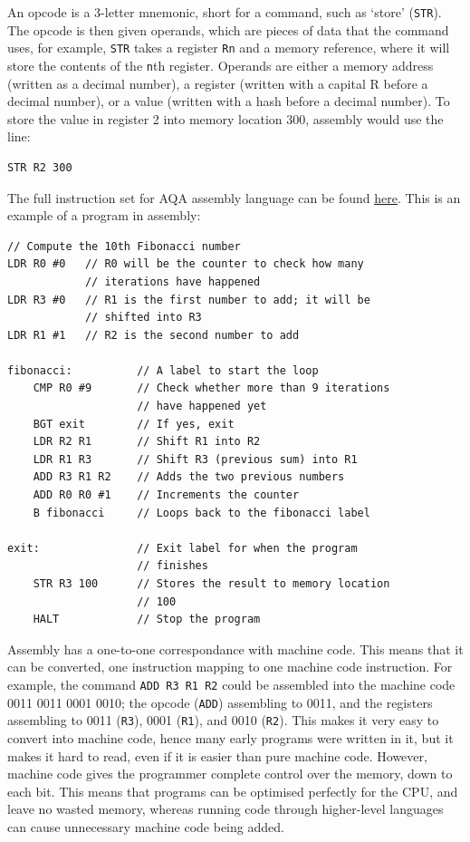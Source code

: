         An opcode is a 3-letter mnemonic, short for a command, such as `store' (\verb|STR|).
        The opcode is then given operands, which are pieces of data that the command uses, for example, \verb|STR| takes a register \verb|Rn| and a memory reference, where it will store the contents of the \verb|n|th register.
        Operands are either a memory address (written as a decimal number), a register (written with a capital R before a decimal number), or a value (written with a hash before a decimal number).
        To store the value in register 2 into memory location 300, assembly would use the line:
        \begin{verbatim}
STR R2 300
        \end{verbatim}

        The full instruction set for AQA assembly language can be found \href{https://pmt.physicsandmathstutor.com/download/Computer-Science/A-level/Past-Papers/AQA/AS-Paper-2/Assembly\%20Language\%20Instruction\%20-\%20Paper\%202\%20AQA\%20Computer\%20Science\%20AS-level.pdf}{here}.
        This is an example of a program in assembly: %
        \begin{verbatim}
// Compute the 10th Fibonacci number
LDR R0 #0   // R0 will be the counter to check how many
            // iterations have happened
LDR R3 #0   // R1 is the first number to add; it will be
            // shifted into R3
LDR R1 #1   // R2 is the second number to add

fibonacci:          // A label to start the loop
    CMP R0 #9       // Check whether more than 9 iterations
                    // have happened yet
    BGT exit        // If yes, exit
    LDR R2 R1       // Shift R1 into R2
    LDR R1 R3       // Shift R3 (previous sum) into R1
    ADD R3 R1 R2    // Adds the two previous numbers
    ADD R0 R0 #1    // Increments the counter
    B fibonacci     // Loops back to the fibonacci label

exit:               // Exit label for when the program
                    // finishes
    STR R3 100      // Stores the result to memory location
                    // 100
    HALT            // Stop the program
        \end{verbatim}

        Assembly has a one-to-one correspondance with machine code.
        This means that it can be converted, one instruction mapping to one machine code instruction.
        For example, the command \verb|ADD R3 R1 R2| could be assembled into the machine code 0011 0011 0001 0010; the opcode (\verb|ADD|) assembling to 0011, and the registers assembling to 0011 (\verb|R3|), 0001 (\verb|R1|), and 0010 (\verb|R2|).
        This makes it very easy to convert into machine code, hence many early programs were written in it, but it makes it hard to read, even if it is easier than pure machine code.
        However, machine code gives the programmer complete control over the memory, down to each bit.
        This means that programs can be optimised perfectly for the CPU, and leave no wasted memory, whereas running code through higher-level languages can cause unnecessary machine code being added.

